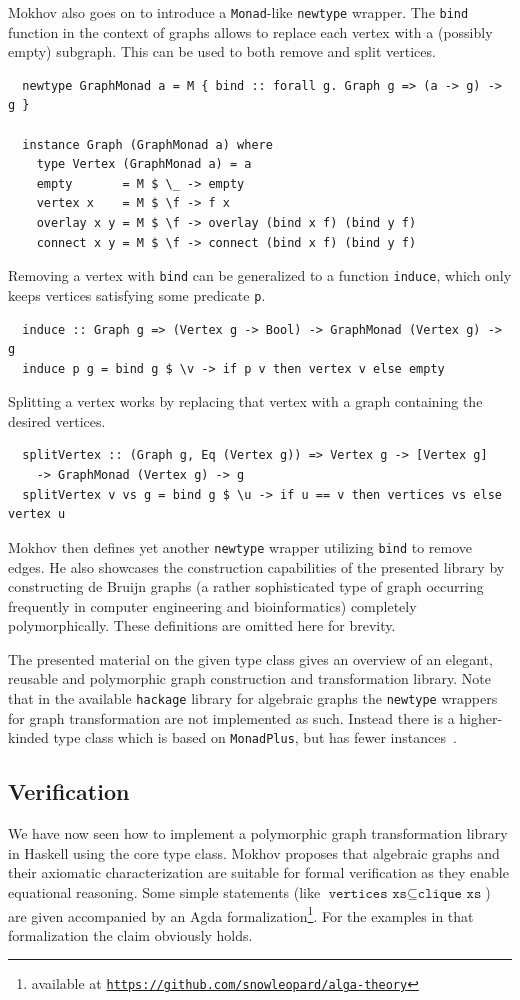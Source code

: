 \documentclass{article}
\newcommand{\hs}{\texttt}
\begin{document}
Mokhov also goes on to introduce a \hs{Monad}-like \hs{newtype} wrapper. The
\hs{bind} function in the context of graphs allows to replace each vertex with a
(possibly empty) subgraph. This can be used to both remove and split vertices.
\begin{verbatim}
  newtype GraphMonad a = M { bind :: forall g. Graph g => (a -> g) -> g }

  instance Graph (GraphMonad a) where
    type Vertex (GraphMonad a) = a
    empty       = M $ \_ -> empty
    vertex x    = M $ \f -> f x
    overlay x y = M $ \f -> overlay (bind x f) (bind y f)
    connect x y = M $ \f -> connect (bind x f) (bind y f)
\end{verbatim}
Removing a vertex with \hs{bind} can be generalized to a function \hs{induce},
which only keeps vertices satisfying some predicate \hs{p}.
\begin{verbatim}
  induce :: Graph g => (Vertex g -> Bool) -> GraphMonad (Vertex g) -> g
  induce p g = bind g $ \v -> if p v then vertex v else empty
\end{verbatim}
Splitting a vertex works by replacing that vertex with a graph containing the
desired vertices.
\begin{verbatim}
  splitVertex :: (Graph g, Eq (Vertex g)) => Vertex g -> [Vertex g] 
    -> GraphMonad (Vertex g) -> g
  splitVertex v vs g = bind g $ \u -> if u == v then vertices vs else vertex u
\end{verbatim}
Mokhov then defines yet another \hs{newtype} wrapper utilizing \hs{bind} to
remove edges. He also showcases the construction capabilities of the presented
library by constructing de Bruijn graphs (a rather sophisticated type of graph
occurring frequently in computer engineering and bioinformatics)
completely polymorphically. These definitions are omitted here for brevity.

The presented material on the given type class gives an overview of an elegant,
reusable and polymorphic graph construction and transformation library. Note
that in the available \texttt{hackage} library for algebraic graphs the
\hs{newtype} wrappers for graph transformation are not implemented as such.
Instead there is a higher-kinded type class which is based
on \hs{MonadPlus}, but has fewer instances~\cite{mokhov2017algebraic}.

\subsection{Verification}\label{sec:verification}
We have now seen how to implement a polymorphic graph transformation library in
Haskell using the core type class. Mokhov proposes that algebraic graphs and
their axiomatic characterization are suitable for formal verification as they
enable equational reasoning. Some
simple statements (like $\hs{vertices xs} \subseteq \hs{clique xs}$) are given
accompanied by an Agda formalization\footnote{available at
  \texttt{\href{https://github.com/snowleopard/alga-theory}{https://github.com/snowleopard/alga-theory}}}.
For the examples in that formalization the claim obviously holds.
\end{document}
